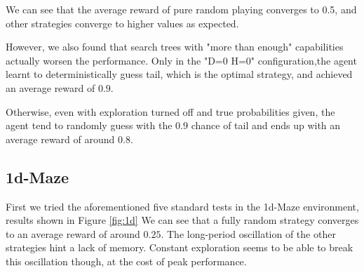\documentclass{article}
\let\Oldsubsection\subsection
\renewcommand{\subsection}{\FloatBarrier\Oldsubsection}
\begin{document}
\begin{flushleft}
We can see that the average reward of pure random playing converges
to 0.5, and other strategies converge to higher values as expected.

However, we also found that search trees 
with "more than enough" capabilities actually worsen the
performance. Only in the "D=0 H=0" configuration,the agent 
learnt to deterministically guess
tail, which is the optimal strategy, and achieved an average reward of $0.9$.

Otherwise, even with exploration turned off and true probabilities given,
the agent tend to randomly guess with the $0.9$ chance of tail and ends up with
an average reward of around $0.8$.

\newpage

\subsection{1d-Maze}

First we tried the aforementioned five standard tests
in the 1d-Maze environment, results shown in Figure \ref{fig:1d}
We can see that a fully random strategy converges to
an average reward of around $0.25$.
The long-period oscillation of the other strategies
hint a lack of memory.
Constant exploration seems to be able to break this
oscillation though, at the cost of peak performance.

\begin{figure}
\vspace{-30em}

\end{figure}

\newpage

\begin{figure}
\vspace{-5em}
\end{figure}


\end{flushleft}
\end{document}
